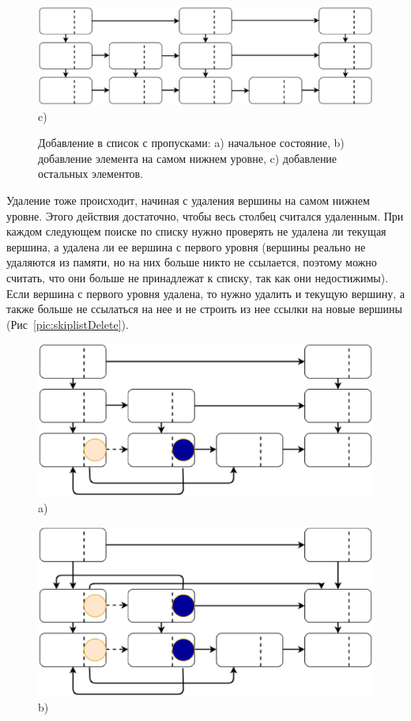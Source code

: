 \documentclass[12pt]{article}
\begin{document}
{\begin{figure}[h!]
\begin{minipage}[h]{0.60\linewidth}
						\centering \includegraphics[width=1\linewidth]{14} c)\\
					\end{minipage}
					\caption{Добавление в список с пропусками: a) начальное состояние, b) добавление элемента на самом нижнем уровне, c) добавление остальных элементов.}
					\label{pic:skiplist}
				\end{figure}
				\par Удаление тоже происходит, начиная с удаления вершины на самом нижнем уровне. Этого действия достаточно, чтобы весь столбец считался удаленным. При каждом следующем поиске по списку нужно проверять не удалена ли текущая вершина, а удалена ли ее вершина с первого уровня (вершины реально не удаляются из памяти, но на них больше никто не ссылается, поэтому можно считать, что они больше не принадлежат к списку, так как они недостижимы). Если вершина с первого уровня удалена, то нужно удалить и текущую вершину, а также больше не ссылаться на нее и не строить из нее ссылки на новые вершины (Рис~\ref{pic:skiplistDelete}).
				\begin{figure}[h!]
					\begin{minipage}[h]{0.45\linewidth}
						\center \includegraphics[width=1\linewidth]{15} a) \\
					\end{minipage}
					\hfill
					\begin{minipage}[h]{0.45\linewidth}
						\center \includegraphics[width=1\linewidth]{16} b) \\

\end{minipage}
\end{figure}}
\end{document}
